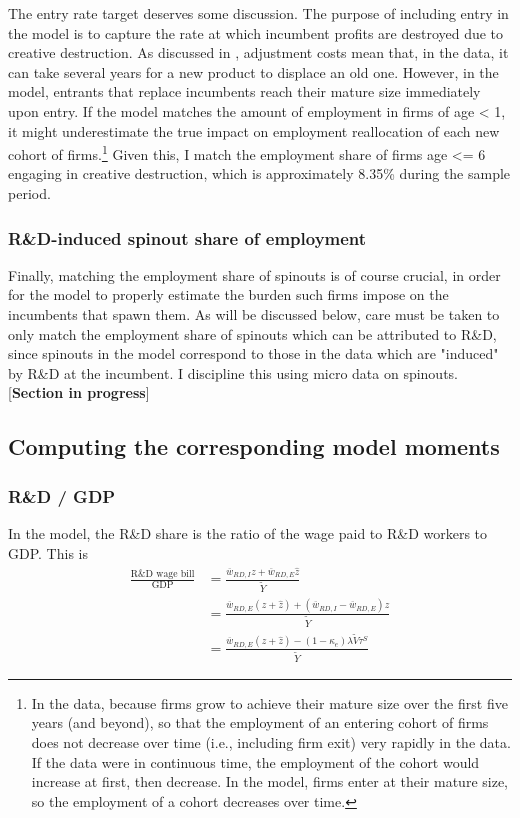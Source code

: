 \documentclass[11pt,english]{article}
\theoremstyle{remark}
\begin{document}
The entry rate target deserves some discussion. The purpose of including entry in the model is to capture the rate at which incumbent profits are destroyed due to creative destruction. As discussed in \cite{klenow_innovative_2020}, adjustment costs mean that, in the data, it can take several years for a new product to displace an old one. However, in the model, entrants that replace incumbents reach their mature size immediately upon entry. If the model matches the amount of employment in firms of age < 1, it might underestimate the true impact on employment reallocation of each new cohort of firms.\footnote{In the data, because firms grow to achieve their mature size over the first five years (and beyond), so that the employment of an entering cohort of firms does not decrease over time (i.e., including firm exit) very rapidly in the data. If the data were in continuous time, the employment of the cohort would increase at first, then decrease. In the model, firms enter at their mature size, so the employment of a cohort decreases over time.} Given this, I match the employment share of firms age <= 6 engaging in creative destruction, which is approximately 8.35\% during the sample period.
 
\subsubsection{R\&D-induced spinout share of employment}

Finally, matching the employment share of spinouts is of course crucial, in order for the model to properly estimate the burden such firms impose on the incumbents that spawn them. As will be discussed below, care must be taken to only match the employment share of spinouts which can be attributed to R\&D, since spinouts in the model correspond to those in the data which are "induced" by R\&D at the incumbent. I discipline this using micro data on spinouts. [\textbf{Section in progress}]

\subsection{Computing the corresponding model moments}

\subsubsection{R\&D / GDP} 

In the model, the R\&D share is the ratio of the wage paid to R\&D workers to GDP. This is
\begin{align*}
\frac{\textrm{R\&D wage bill}}{\textrm{GDP}} &= \frac{\overline{w}_{RD,I} z + \overline{w}_{RD,E} \hat{z}}{\tilde{Y}} \\ 
&= \frac{\overline{w}_{RD,E} (z + \hat{z}) + (\overline{w}_{RD,I} - \overline{w}_{RD,E})z}{\tilde{Y}} \\
&= \frac{\overline{w}_{RD,E} (z + \hat{z}) - (1-\kappa_e) \lambda \tilde{V} \tau^S}{\tilde{Y}}
\end{align*}
\end{document}
